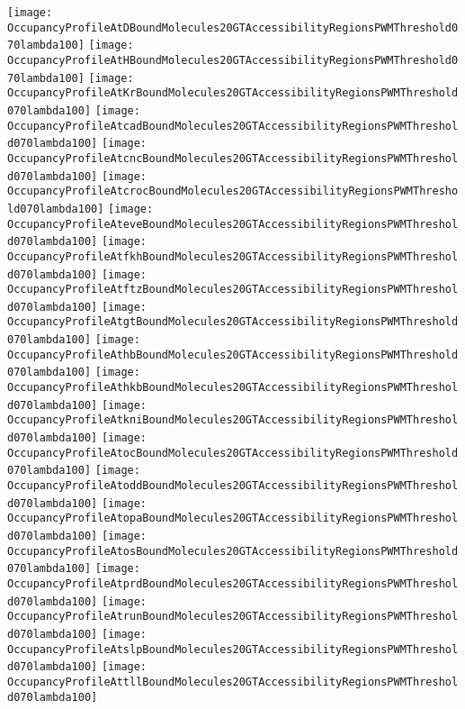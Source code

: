 \documentclass[11pt]{article}
\begin{document}
 


\begin{center}
\texttt{[image: OccupancyProfileAtDBoundMolecules20GTAccessibilityRegionsPWMThreshold070lambda100]}
\texttt{[image: OccupancyProfileAtHBoundMolecules20GTAccessibilityRegionsPWMThreshold070lambda100]}
\texttt{[image: OccupancyProfileAtKrBoundMolecules20GTAccessibilityRegionsPWMThreshold070lambda100]}
\texttt{[image: OccupancyProfileAtcadBoundMolecules20GTAccessibilityRegionsPWMThreshold070lambda100]}
\texttt{[image: OccupancyProfileAtcncBoundMolecules20GTAccessibilityRegionsPWMThreshold070lambda100]}
\texttt{[image: OccupancyProfileAtcrocBoundMolecules20GTAccessibilityRegionsPWMThreshold070lambda100]}
\texttt{[image: OccupancyProfileAteveBoundMolecules20GTAccessibilityRegionsPWMThreshold070lambda100]}
\texttt{[image: OccupancyProfileAtfkhBoundMolecules20GTAccessibilityRegionsPWMThreshold070lambda100]}
\texttt{[image: OccupancyProfileAtftzBoundMolecules20GTAccessibilityRegionsPWMThreshold070lambda100]}
\texttt{[image: OccupancyProfileAtgtBoundMolecules20GTAccessibilityRegionsPWMThreshold070lambda100]}
\texttt{[image: OccupancyProfileAthbBoundMolecules20GTAccessibilityRegionsPWMThreshold070lambda100]}
\texttt{[image: OccupancyProfileAthkbBoundMolecules20GTAccessibilityRegionsPWMThreshold070lambda100]}
\texttt{[image: OccupancyProfileAtkniBoundMolecules20GTAccessibilityRegionsPWMThreshold070lambda100]}
\texttt{[image: OccupancyProfileAtocBoundMolecules20GTAccessibilityRegionsPWMThreshold070lambda100]}
\texttt{[image: OccupancyProfileAtoddBoundMolecules20GTAccessibilityRegionsPWMThreshold070lambda100]}
\texttt{[image: OccupancyProfileAtopaBoundMolecules20GTAccessibilityRegionsPWMThreshold070lambda100]}
\texttt{[image: OccupancyProfileAtosBoundMolecules20GTAccessibilityRegionsPWMThreshold070lambda100]}
\texttt{[image: OccupancyProfileAtprdBoundMolecules20GTAccessibilityRegionsPWMThreshold070lambda100]}
\texttt{[image: OccupancyProfileAtrunBoundMolecules20GTAccessibilityRegionsPWMThreshold070lambda100]}
\texttt{[image: OccupancyProfileAtslpBoundMolecules20GTAccessibilityRegionsPWMThreshold070lambda100]}
\texttt{[image: OccupancyProfileAttllBoundMolecules20GTAccessibilityRegionsPWMThreshold070lambda100]}
\end{center}


\end{document}
